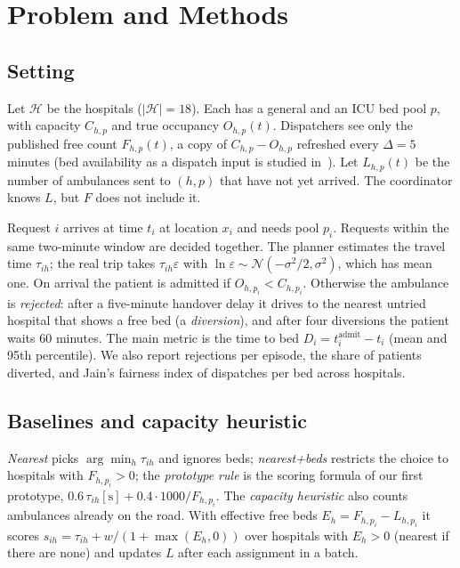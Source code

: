 \documentclass[conference]{IEEEtran}
\begin{document}
\section{Problem and Methods}
\subsection{Setting}
Let $\mathcal{H}$ be the hospitals ($|\mathcal{H}|=18$). Each has a general and an ICU bed pool $p$, with capacity $C_{h,p}$ and true occupancy $O_{h,p}(t)$. Dispatchers see only the published free count $F_{h,p}(t)$, a copy of $C_{h,p}-O_{h,p}$ refreshed every $\Delta=5$ minutes (bed availability as a dispatch input is studied in~\cite{xu2024emergency}). Let $L_{h,p}(t)$ be the number of ambulances sent to $(h,p)$ that have not yet arrived. The coordinator knows $L$, but $F$ does not include it.

Request $i$ arrives at time $t_i$ at location $x_i$ and needs pool $p_i$. Requests within the same two-minute window are decided together. The planner estimates the travel time $\tau_{ih}$; the real trip takes $\tau_{ih}\varepsilon$ with $\ln\varepsilon\sim\mathcal{N}(-\sigma^2/2,\sigma^2)$, which has mean one. On arrival the patient is admitted if $O_{h,p_i}<C_{h,p_i}$. Otherwise the ambulance is \emph{rejected}: after a five-minute handover delay it drives to the nearest untried hospital that shows a free bed (a \emph{diversion}), and after four diversions the patient waits 60 minutes. The main metric is the time to bed $D_i=t^{\mathrm{admit}}_i-t_i$ (mean and 95th percentile). We also report rejections per episode, the share of patients diverted, and Jain's fairness index of dispatches per bed across hospitals.

\subsection{Baselines and capacity heuristic}
\emph{Nearest} picks $\arg\min_h\tau_{ih}$ and ignores beds; \emph{nearest+beds} restricts the choice to hospitals with $F_{h,p_i}>0$; the \emph{prototype rule} is the scoring formula of our first prototype, $0.6\,\tau_{ih}[\mathrm{s}]+0.4\cdot1000/F_{h,p_i}$. The \emph{capacity heuristic} also counts ambulances already on the road. With effective free beds $E_h=F_{h,p_i}-L_{h,p_i}$ it scores $s_{ih}=\tau_{ih}+w/(1+\max(E_h,0))$ over hospitals with $E_h>0$ (nearest if there are none) and updates $L$ after each assignment in a batch.
\end{document}
